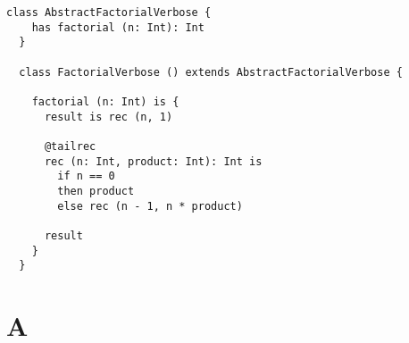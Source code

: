 \documentclass[12pt,a4paper]{book}
\begin{document}
    \begin{lstlisting}[label={lst:exampleFactorialVerbose}]
  class AbstractFactorialVerbose {
    has factorial (n: Int): Int
  }

  class FactorialVerbose () extends AbstractFactorialVerbose {

    factorial (n: Int) is {
      result is rec (n, 1)

      @tailrec
      rec (n: Int, product: Int): Int is
        if n == 0
        then product
        else rec (n - 1, n * product)

      result
    }
  }
    \end{lstlisting}

    \appendix


    \chapter{A}
\end{document}
